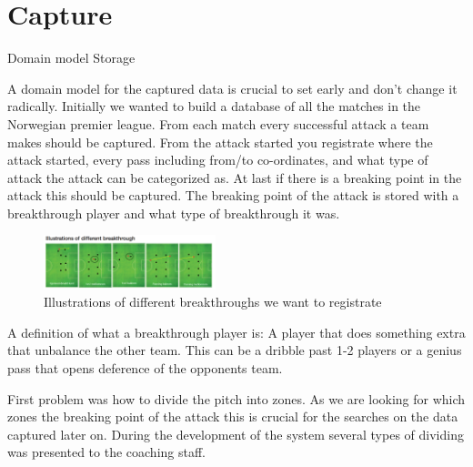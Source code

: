 \section{Capture}

Domain model
Storage


A domain model for the captured data is crucial to set early and don't change it radically. Initially we wanted to build a database of all the matches in the Norwegian premier league. From each match every successful attack a team makes should be captured. From the attack started you registrate where the attack started, every pass including from/to co-ordinates, and what type of attack the attack can be categorized as. At last if there is a breaking point in the attack this should be captured. The breaking point of the attack is stored with a breakthrough player and what type of breakthrough it was.

\begin{figure}[ht!]
\centering
\includegraphics[width=50mm]{images/general/different_breakthroughs.png}
\caption{Illustrations of different breakthroughs we want to registrate}
\label{overflow}
\end{figure}

A definition of what a breakthrough player is: A player that does something extra that unbalance the other team. This can be a dribble past 1-2 players or a genius pass that opens deference of the opponents team. 

First problem was how to divide the pitch into zones. As we are looking for which zones the breaking point of the attack this is crucial for the searches on the data captured later on. During the development of the system several types of dividing was presented to the coaching staff. 

